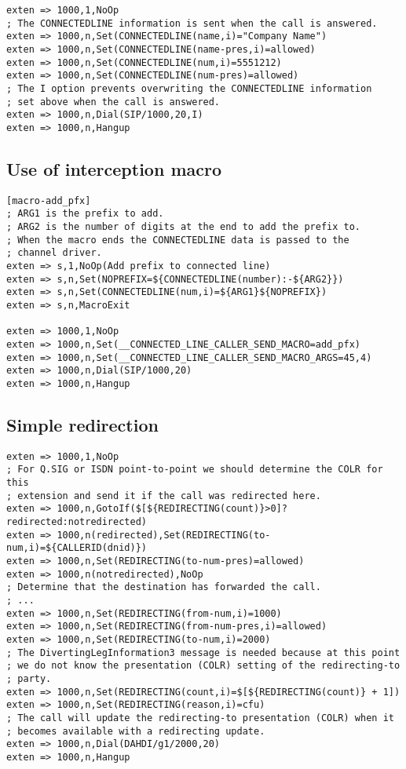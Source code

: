 \begin{verbatim}
exten => 1000,1,NoOp
; The CONNECTEDLINE information is sent when the call is answered.
exten => 1000,n,Set(CONNECTEDLINE(name,i)="Company Name")
exten => 1000,n,Set(CONNECTEDLINE(name-pres,i)=allowed)
exten => 1000,n,Set(CONNECTEDLINE(num,i)=5551212)
exten => 1000,n,Set(CONNECTEDLINE(num-pres)=allowed)
; The I option prevents overwriting the CONNECTEDLINE information
; set above when the call is answered.
exten => 1000,n,Dial(SIP/1000,20,I)
exten => 1000,n,Hangup
\end{verbatim}

\subsection{Use of interception macro}

\begin{verbatim}
[macro-add_pfx]
; ARG1 is the prefix to add.
; ARG2 is the number of digits at the end to add the prefix to.
; When the macro ends the CONNECTEDLINE data is passed to the
; channel driver.
exten => s,1,NoOp(Add prefix to connected line)
exten => s,n,Set(NOPREFIX=${CONNECTEDLINE(number):-${ARG2}})
exten => s,n,Set(CONNECTEDLINE(num,i)=${ARG1}${NOPREFIX})
exten => s,n,MacroExit

exten => 1000,1,NoOp
exten => 1000,n,Set(__CONNECTED_LINE_CALLER_SEND_MACRO=add_pfx)
exten => 1000,n,Set(__CONNECTED_LINE_CALLER_SEND_MACRO_ARGS=45,4)
exten => 1000,n,Dial(SIP/1000,20)
exten => 1000,n,Hangup
\end{verbatim}

\subsection{Simple redirection}
\begin{verbatim}
exten => 1000,1,NoOp
; For Q.SIG or ISDN point-to-point we should determine the COLR for this
; extension and send it if the call was redirected here.
exten => 1000,n,GotoIf($[${REDIRECTING(count)}>0]?redirected:notredirected)
exten => 1000,n(redirected),Set(REDIRECTING(to-num,i)=${CALLERID(dnid)})
exten => 1000,n,Set(REDIRECTING(to-num-pres)=allowed)
exten => 1000,n(notredirected),NoOp
; Determine that the destination has forwarded the call.
; ...
exten => 1000,n,Set(REDIRECTING(from-num,i)=1000)
exten => 1000,n,Set(REDIRECTING(from-num-pres,i)=allowed)
exten => 1000,n,Set(REDIRECTING(to-num,i)=2000)
; The DivertingLegInformation3 message is needed because at this point
; we do not know the presentation (COLR) setting of the redirecting-to
; party.
exten => 1000,n,Set(REDIRECTING(count,i)=$[${REDIRECTING(count)} + 1])
exten => 1000,n,Set(REDIRECTING(reason,i)=cfu)
; The call will update the redirecting-to presentation (COLR) when it
; becomes available with a redirecting update.
exten => 1000,n,Dial(DAHDI/g1/2000,20)
exten => 1000,n,Hangup
\end{verbatim}

